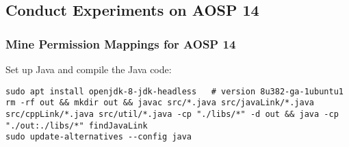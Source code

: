 \subsection{Conduct Experiments on AOSP 14}
\label{task:20240213_aosp}

\subsubsection{Mine Permission Mappings for AOSP 14}

Set up Java and compile the Java code:
\begin{lstlisting}
sudo apt install openjdk-8-jdk-headless   # version 8u382-ga-1ubuntu1
rm -rf out && mkdir out && javac src/*.java src/javaLink/*.java src/cppLink/*.java src/util/*.java -cp "./libs/*" -d out && java -cp "./out:./libs/*" findJavaLink
sudo update-alternatives --config java
\end{lstlisting}


